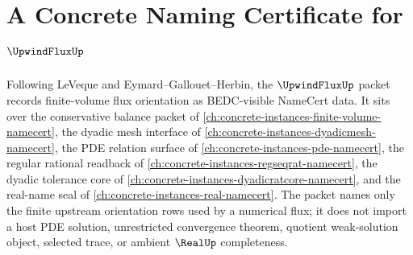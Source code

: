 \chapter{A Concrete Naming Certificate for $\UpwindFluxUp$}
\label{ch:concrete-instances-upwind-flux-namecert}

Following LeVeque and Eymard--Gallouet--Herbin, the $\UpwindFluxUp$ packet records finite-volume flux orientation as BEDC-visible NameCert data. It sits over the conservative balance packet of \autoref{ch:concrete-instances-finite-volume-namecert}, the dyadic mesh interface of \autoref{ch:concrete-instances-dyadicmesh-namecert}, the PDE relation surface of \autoref{ch:concrete-instances-pde-namecert}, the regular rational readback of \autoref{ch:concrete-instances-regseqrat-namecert}, the dyadic tolerance core of \autoref{ch:concrete-instances-dyadicratcore-namecert}, and the real-name seal of \autoref{ch:concrete-instances-real-namecert}. The packet names only the finite upstream orientation rows used by a numerical flux; it does not import a host PDE solution, unrestricted convergence theorem, quotient weak-solution object, selected trace, or ambient $\RealUp$ completeness.

